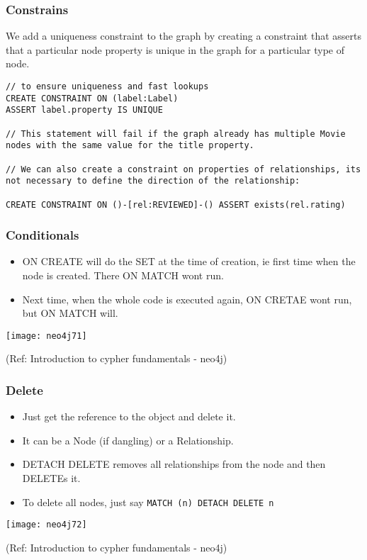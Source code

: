 \begin{frame}[fragile]\frametitle{Constrains}
We add a uniqueness constraint to the graph by creating a constraint that asserts that a particular node property is unique in the graph for a particular type of node.

\begin{lstlisting}
// to ensure uniqueness and fast lookups
CREATE CONSTRAINT ON (label:Label)
ASSERT label.property IS UNIQUE

// This statement will fail if the graph already has multiple Movie nodes with the same value for the title property.

// We can also create a constraint on properties of relationships, its not necessary to define the direction of the relationship:

CREATE CONSTRAINT ON ()-[rel:REVIEWED]-() ASSERT exists(rel.rating)
\end{lstlisting}	  


\end{frame}

\begin{frame}[fragile]\frametitle{Conditionals}

\begin{itemize}
\item ON CREATE will do the SET at the time of creation, ie first time when the node is created. There ON MATCH wont run.
\item Next time, when the whole code is executed again, ON CRETAE wont run, but ON MATCH will.
\end{itemize}

\begin{center}
\texttt{[image: neo4j71]}
\end{center}	  


{\tiny (Ref: Introduction to cypher fundamentals  - neo4j)}
 

\end{frame}

\begin{frame}[fragile]\frametitle{Delete}

\begin{itemize}
\item Just get the reference to the object and delete it.
\item It can be a Node (if dangling) or a Relationship.
\item DETACH DELETE removes all relationships from the node and then DELETEs it.
\item To delete all nodes, just say \lstinline|MATCH (n) DETACH DELETE n|
\end{itemize}

\begin{center}
\texttt{[image: neo4j72]}
\end{center}	  


{\tiny (Ref: Introduction to cypher fundamentals  - neo4j)}
 

\end{frame}


